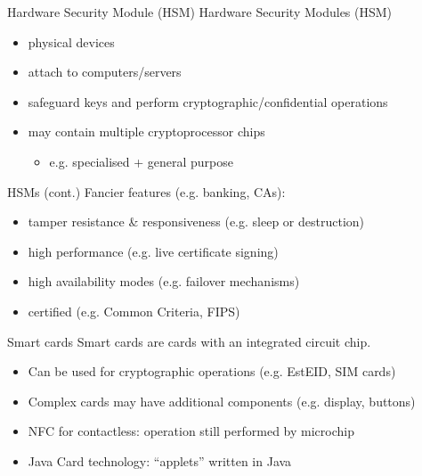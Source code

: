 \begin{frame}{Hardware Security Module (HSM)}
  Hardware Security Modules (HSM)
  \begin{itemize}[<+(1)->]
    \item physical devices
    \item attach to computers/servers
    \item safeguard keys and perform cryptographic/confidential operations
    \item may contain multiple cryptoprocessor chips
    \begin{itemize}
      \item e.g. specialised + general purpose
    \end{itemize}
  \end{itemize}
\end{frame}

\begin{frame}{HSMs (cont.)}
  \pause
  Fancier features (e.g. banking, CAs):
  \begin{itemize}[<+(1)->]
    \item tamper resistance \& responsiveness (e.g. sleep or destruction)
    \item high performance (e.g. live certificate signing)
    \item high availability modes (e.g. failover mechanisms)
    \item certified (e.g. Common Criteria, FIPS)
  \end{itemize}
\end{frame}

\begin{frame}{Smart cards}
  Smart cards are cards with an integrated circuit chip.
  \begin{itemize}[<+(1)->]
    \item Can be used for cryptographic operations (e.g. EstEID, SIM cards)
    \item Complex cards may have additional components (e.g. display, buttons)
    \item NFC for contactless: operation still performed by microchip
    \item Java Card technology: \enquote{applets} written in Java
  \end{itemize}
\end{frame}

